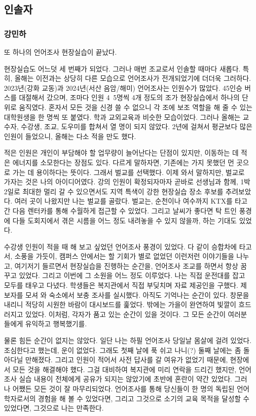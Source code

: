 \subsection{인솔자}

\subsubsection{강민하}

또 하나의 언어조사 현장실습이 끝났다.

현장실습도 어느덧 세 번째가 되었다. 그러나 매번 조교로서 인솔할 때마다 새롭다. 특히, 올해는 이전과는 상당히 다른 모습으로 언어조사가 전개되었기에 더더욱 그러하다. 2023년(강화 교동)과 2024년(서산 음암/해미) 언어조사는 인원수가 많았다. 45인승 버스를 대절해서 갔으며, 조마다 인원 4~5명씩 4개 정도의 조가 현장실습에서 하나의 단위로 움직였다. 혼자서 모든 것을 신경 쓸 수 없으니 각 조에 보조 역할을 해 줄 수 있는 대학원생을 한 명씩 또 붙였다. 학과 교외교육과 비슷한 모습이었다. 그러나 올해는 교수자, 수강생, 조교, 도우미를 합쳐서 열 명이 되지 않았다. 2년에 걸쳐서 평균보다 많은 인원이 들었으니, 올해는 다소 적을 만도 했다.

적은 인원은 개인이 부담해야 할 업무량이 늘어난다는 단점이 있지만, 이동하는 데 적은 에너지를 소모한다는 장점도 있다. 다르게 말하자면, 기존에는 가지 못했던 먼 곳으로 가는 데 용이하다는 뜻이다. 그래서 벌교를 선택했다. 이제 와서 말하지만, 벌교로 가자는 것은 나의 아이디어였다. 강의 인원이 확정되자마자 곧바로 선생님과 함께, 1박 2일로 최대한 멀리 갈 수 있으면서도 지역 특색이 강한 현장실습 장소 후보를 추려보았다. 여러 곳이 나왔지만 나는 벌교를 골랐다. 벌교는, 순천이나 여수까지 KTX를 타고 간 다음 렌터카를 통해 수월하게 접근할 수 있었다. 그리고 날씨가 좋다면 탁 트인 풍경에 다들 도회지에서 겪은 시름을 어느 정도 내려놓을 수 있지 않을까, 하는 기대도 있었다.

수강생 인원이 적을 때 해 보고 싶었던 언어조사 풍경이 있었다. 다 같이 승합차에 타고서, 소풍을 가듯이, 캠퍼스 안에서는 할 기회가 별로 없었던 이런저런 이야기들을 나누고, 여기저기 들르면서 현장실습을 진행하는 순간을, 언어조사 조교를 하면서 항상 꿈꾸고 있었다. 그리고 이번에 그 소원을 어느 정도 이루었다. 나는 직접 운전대를 잡고 모두를 태우고 다녔다. 학생들은 복지관에서 직접 부딪치며 자료 제공인을 구했다. 제보자를 모셔 와 숙소에서 보충 조사를 실시했다. 아직도 기억나는 순간이 있다. 창문을 내리니 적당히 시원한 바람이 대시보드를 훑었다. 밖에는 가을이 완연하여 빛깔이 흐드러지고 있었다. 이처럼, 각자가 품고 있는 순간이 있을 것이다. 그 모든 순간이 여러분들에게 유익하고 행복했기를.

물론 힘든 순간이 없지는 않았다. 일단 나는 하필 언어조사 당일날 몸살에 걸려 있었다. 조심한다고 했는데, 운이 없었다. 그래도 첫째 날에 푹 쉬고 나니(?) 둘째 날에는 좀 돌아다닐 만해졌다. 그리고 인원이 적어서 사전 답사를 갈 여유가 없었기 때문에, 현장에서 모든 것을 해결해야 했다. 그걸 대비하여 복지관에 미리 연락을 드리긴 했지만, 언어조사 실습 내용이 전체에게 공유가 되지는 않았기에 초반에 혼란이 약간 있었다. 그러나 어쨌든 모든 것이 잘 마무리되었다. 언어조사를 통해 당신들이 한 명의 독립된 언어학자로서의 경험을 해 볼 수 있었다면, 그리고 그것으로 소기의 교육 목적을 달성할 수 있었다면, 그것으로 나는 만족한다.


